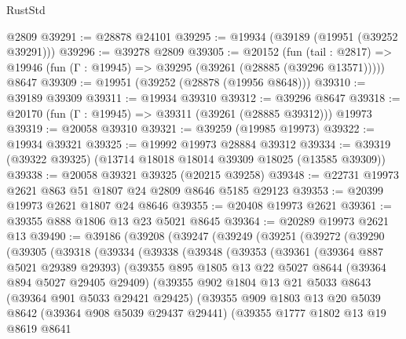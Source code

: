 \begin{lexlean}{RustStd}
\begin{coremodule}
    @2809
@39291 := @28878 @24101
@39295 := @19934 (@39189 (@19951 (@39252 @39291)))
@39296 := @39278 @2809
@39305 := @20152
    (fun (tail : @2817) => @19946 (fun (Γ : @19945) => @39295 (@39261 (@28885 (@39296 @13571)))))
    @8647
@39309 := @19951 (@39252 (@28878 (@19956 @8648)))
@39310 := @39189 @39309
@39311 := @19934 @39310
@39312 := @39296 @8647
@39318 := @20170 (fun (Γ : @19945) => @39311 (@39261 (@28885 @39312))) @19973
@39319 := @20058 @39310
@39321 := @39259 (@19985 @19973)
@39322 := @19934 @39321
@39325 := @19992 @19973 @28884 @39312
@39334 := @39319 (@39322 @39325) (@13714 @18018 @18014 @39309 @18025 (@13585 @39309))
@39338 := @20058 @39321 @39325 (@20215 @39258)
@39348 := @22731 @19973 @2621 @863 @51 @1807 @24 @2809 @8646 @5185 @29123
@39353 := @20399 @19973 @2621 @1807 @24 @8646
@39355 := @20408 @19973 @2621
@39361 := @39355 @888 @1806 @13 @23 @5021 @8645
@39364 := @20289 @19973 @2621 @13
@39490 := @39186
    (@39208
      (@39247
        (@39249
          (@39251
            (@39272
              (@39290
                (@39305
                  (@39318
                    (@39334
                      (@39338
                        (@39348
                          (@39353
                            (@39361
                              (@39364 @887 @5021 @29389 @29393)
                              (@39355
                                @895
                                @1805
                                @13
                                @22
                                @5027
                                @8644
                                (@39364 @894 @5027 @29405 @29409)
                                (@39355
                                  @902
                                  @1804
                                  @13
                                  @21
                                  @5033
                                  @8643
                                  (@39364 @901 @5033 @29421 @29425)
                                  (@39355
                                    @909
                                    @1803
                                    @13
                                    @20
                                    @5039
                                    @8642
                                    (@39364 @908 @5039 @29437 @29441)
                                    (@39355
                                      @1777
                                      @1802
                                      @13
                                      @19
                                      @8619
                                      @8641

\end{coremodule}
\end{lexlean}
